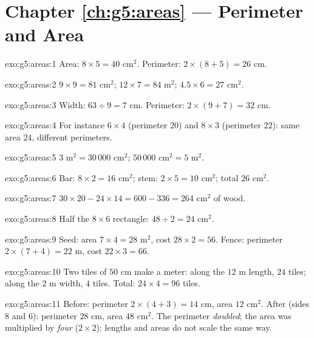 \section*{Chapter \ref{ch:g5:areas} --- Perimeter and Area}

\begin{solution}{exo:g5:areas:1}
Area: $8 \times 5 = 40$ cm$^2$. Perimeter:
$2 \times (8 + 5) = 26$ cm.
\end{solution}

\begin{solution}{exo:g5:areas:2}
$9 \times 9 = 81$ cm$^2$; \quad $12 \times 7 = 84$ m$^2$; \quad
$4.5 \times 6 = 27$ cm$^2$.
\end{solution}

\begin{solution}{exo:g5:areas:3}
Width: $63 \div 9 = 7$ cm. Perimeter: $2 \times (9 + 7) = 32$ cm.
\end{solution}

\begin{solution}{exo:g5:areas:4}
For instance $6 \times 4$ (perimeter $20$) and $8 \times 3$
(perimeter $22$): same area $24$, different perimeters.
\end{solution}

\begin{solution}{exo:g5:areas:5}
$3$ m$^2 = 30\,000$ cm$^2$; \quad $50\,000$ cm$^2 = 5$ m$^2$.
\end{solution}

\begin{solution}{exo:g5:areas:6}
Bar: $8 \times 2 = 16$ cm$^2$; stem: $2 \times 5 = 10$ cm$^2$;
total $26$ cm$^2$.
\end{solution}

\begin{solution}{exo:g5:areas:7}
$30 \times 20 - 24 \times 14 = 600 - 336 = 264$ cm$^2$ of wood.
\end{solution}

\begin{solution}{exo:g5:areas:8}
Half the $8 \times 6$ rectangle: $48 \div 2 = 24$ cm$^2$.
\end{solution}

\begin{solution}{exo:g5:areas:9}
Seed: area $7 \times 4 = 28$ m$^2$, cost $28 \times 2 = 56$.
Fence: perimeter $2 \times (7 + 4) = 22$ m, cost
$22 \times 3 = 66$.
\end{solution}

\begin{solution}{exo:g5:areas:10}
Two tiles of $50$ cm make a meter: along the $12$ m length,
$24$ tiles; along the $2$ m width, $4$ tiles. Total:
$24 \times 4 = 96$ tiles.
\end{solution}

\begin{solution}{exo:g5:areas:11}
Before: perimeter $2 \times (4 + 3) = 14$ cm, area $12$ cm$^2$.
After (sides $8$ and $6$): perimeter $28$ cm, area $48$ cm$^2$.
The perimeter \emph{doubled}; the area was multiplied by
\emph{four} ($2 \times 2$): lengths and areas do not scale the same
way.
\end{solution}
